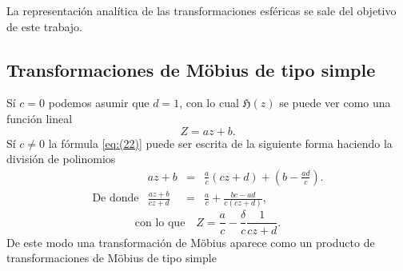 \documentclass{matematicasud}
\begin{document}
La representación analítica de las transformaciones esféricas se sale del objetivo de este trabajo.

\subsection{Transformaciones de Möbius de tipo simple}\label{cap:3.3}
Sí $c=0$ podemos asumir que $d=1$, con lo cual $\mathfrak{H}(z)$ se puede ver como una función lineal
\begin{equation*}
    Z=az+b.
\end{equation*}
Sí $c\neq0$ la fórmula \eqref{eq:(22)} puede ser escrita de la siguiente forma haciendo la división de polinomios
\begin{equation*}
\begin{array}{lrcl}
     &az+b &=& \frac{a}{c}\left(cz+d\right)+\left(b-\frac{ad}{c}\right).\\
    \text{De donde} & \frac{az+b}{cz+d} &=& \frac{a}{c}+\frac{bc-ad}{c(cz+d)},
\end{array}
\end{equation*}
\begin{equation}
    \text{con lo que} \quad Z = \frac{a}{c}-\frac{\delta}{c}\frac{1}{cz+d}. 
    \label{eq:(29)}
\end{equation}
De este modo una transformación de Möbius aparece como un producto de transformaciones de Möbius de tipo simple
\end{document}
